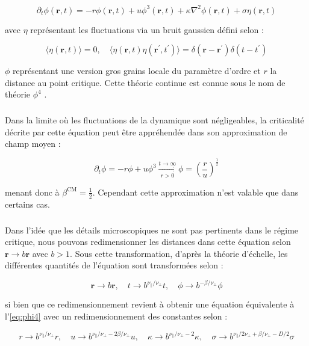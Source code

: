 \begin{equation}
	\partial_t \phi (\mathbf{r}, t) = -r\phi (\mathbf{r}, t) + u \phi^3(\mathbf{r}, t) + \kappa\nabla^2 \phi (\mathbf{r}, t) + \sigma\eta(\mathbf{r}, t)
\end{equation}

\noindent avec $\eta$ représentant les fluctuations via un bruit gaussien défini selon :

\begin{equation}
\langle \eta(\mathbf{r}, t) \rangle = 0, \quad \langle \eta(\mathbf{r}, t) \eta(\mathbf{r}^\prime, t^\prime)\rangle = \delta(\mathbf{r}-\mathbf{r}^\prime)\delta(t-t^\prime)
\label{eq:phi4}
\end{equation}

\noindent $\phi$ représentant une version gros grains locale du paramètre d'ordre et $r$ la distance au point critique. Cette théorie continue est connue sous le nom de théorie $\phi^4$ \cite{kardar_statistical_2007}.

\subparagraph{}Dans la limite où les fluctuations de la dynamique sont négligeables, la criticalité décrite par cette équation peut être appréhendée dans son approximation de champ moyen :

\begin{equation}
	\partial_t \phi = -r\phi + u\phi^3 \xrightarrow[r>0]{t\rightarrow \infty} \phi = \left( \frac{r}{u} \right)^\frac{1}{2}
\end{equation}

\noindent menant donc à $\beta^\text{CM} = \frac{1}{2}$. Cependant cette approximation n'est valable que dans certains cas.

\subparagraph{}Dans l'idée que les détails microscopiques ne sont pas pertinents dans le régime critique, nous pouvons redimensionner les distances dans cette équation selon $\mathbf{r}\rightarrow b\mathbf{r}$ avec $b>1$. Sous cette transformation, d'après la théorie d'échelle, les différentes quantités de l'équation sont transformées selon :

\begin{equation}
	\mathbf{r}\rightarrow b\mathbf{r}, \quad t \rightarrow b^{\nu_\parallel/\nu_\perp}t, \quad \phi \rightarrow b^{-\beta/\nu_\perp}\phi
\end{equation}

\noindent si bien que ce redimensionnement revient à obtenir une équation équivalente à l'\autoref{eq:phi4} avec un redimensionnement des constantes selon :

\begin{equation}
	r \rightarrow b^{\nu_\parallel/\nu_\perp} r, \quad u \rightarrow b^{\nu_\parallel/\nu_\perp - 2\beta/\nu_\perp} u, \quad \kappa \rightarrow b^{\nu_\parallel/\nu_\perp-2}\kappa, \quad \sigma \rightarrow b^{\nu_\parallel/2\nu_\perp+\beta/\nu_\perp - D/2}\sigma
\end{equation}

